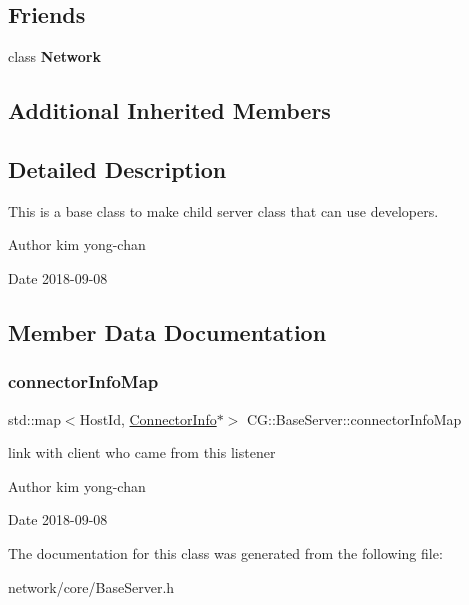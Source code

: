 \subsection*{Friends}
\begin{DoxyCompactItemize}
\item 
\mbox{\label{class_c_g_1_1_base_server_a88b59289ffd793fecd040d32e397b1e9}} 
class {\bfseries Network}
\end{DoxyCompactItemize}
\subsection*{Additional Inherited Members}


\subsection{Detailed Description}
This is a base class to make child server class that can use developers. 

\begin{DoxyAuthor}{Author}
kim yong-\/chan 
\end{DoxyAuthor}
\begin{DoxyDate}{Date}
2018-\/09-\/08 
\end{DoxyDate}


\subsection{Member Data Documentation}
\mbox{\label{class_c_g_1_1_base_server_a873e8a48776e1545c06b3dc0e20bdeda}} 
\subsubsection{\texorpdfstring{connector\+Info\+Map}{connectorInfoMap}}
{\footnotesize\ttfamily std\+::map$<$Host\+Id, \mbox{\hyperlink{class_c_g_1_1_connector_info}{Connector\+Info}}$\ast$$>$ C\+G\+::\+Base\+Server\+::connector\+Info\+Map\hspace{0.3cm}{\ttfamily [protected]}}



link with client who came from this listener 

\begin{DoxyAuthor}{Author}
kim yong-\/chan 
\end{DoxyAuthor}
\begin{DoxyDate}{Date}
2018-\/09-\/08 
\end{DoxyDate}


The documentation for this class was generated from the following file\+:\begin{DoxyCompactItemize}
\item 
network/core/Base\+Server.\+h\end{DoxyCompactItemize}
